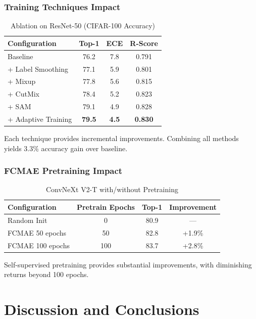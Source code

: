 \subsubsection{Training Techniques Impact}

\begin{table}[h]
\centering
\caption{Ablation on ResNet-50 (CIFAR-100 Accuracy)}
\begin{tabular}{lccc}
\hline
\textbf{Configuration} & \textbf{Top-1} & \textbf{ECE} & \textbf{R-Score} \\
\hline
Baseline & 76.2 & 7.8 & 0.791 \\
+ Label Smoothing & 77.1 & 5.9 & 0.801 \\
+ Mixup & 77.8 & 5.6 & 0.815 \\
+ CutMix & 78.4 & 5.2 & 0.823 \\
+ SAM & 79.1 & 4.9 & 0.828 \\
+ Adaptive Training & \textbf{79.5} & \textbf{4.5} & \textbf{0.830} \\
\hline
\end{tabular}
\end{table}

Each technique provides incremental improvements. Combining all methods yields 3.3\% accuracy gain over baseline.

\subsubsection{FCMAE Pretraining Impact}

\begin{table}[h]
\centering
\caption{ConvNeXt V2-T with/without Pretraining}
\begin{tabular}{lccc}
\hline
\textbf{Configuration} & \textbf{Pretrain Epochs} & \textbf{Top-1} & \textbf{Improvement} \\
\hline
Random Init & 0 & 80.9 & --- \\
FCMAE 50 epochs & 50 & 82.8 & +1.9\% \\
FCMAE 100 epochs & 100 & 83.7 & +2.8\% \\
\hline
\end{tabular}
\end{table}

Self-supervised pretraining provides substantial improvements, with diminishing returns beyond 100 epochs.

\section{Discussion and Conclusions}


